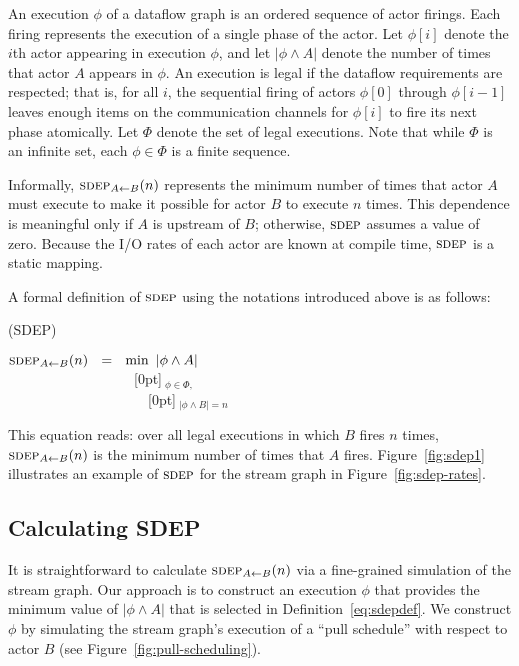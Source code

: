 An execution $\phi$ of a dataflow graph is an ordered sequence of
actor firings.  Each firing represents the execution of a single phase
of the actor.  Let $\phi[i]$ denote the $i$th actor appearing in
execution $\phi$, and let $|\phi \wedge A|$ denote the number of times
that actor $A$ appears in $\phi$.  An execution is legal if the
dataflow requirements are respected; that is, for all $i$, the
sequential firing of actors $\phi[0]$ through $\phi[i-1]$ leaves
enough items on the communication channels for $\phi[i]$ to fire its
next phase atomically.  Let $\Phi$ denote the set of legal executions.
Note that while $\Phi$ is an infinite set, each $\phi \in \Phi$ is a
finite sequence.

Informally, $\textsc{sdep}_{A \small{\leftarrow} B}(n)$ represents the minimum number of times
that actor $A$ must execute to make it possible for actor $B$ to
execute $n$ times.  This dependence is meaningful only if $A$ is
upstream of $B$; otherwise, $\textsc{sdep}$ assumes a value of zero.  Because
the I/O rates of each actor are known at compile time, $\textsc{sdep}$ is a
static mapping.

A formal definition of $\textsc{sdep}$ using the notations introduced above is
as follows:
\begin{definition}(SDEP)
\begin{center}
$\textsc{sdep}_{A \small{\leftarrow} B}(n)~~ = ~~\min~|\phi \wedge A|$ \\
~~~~~~~~~~~~~~~~~{\tiny ~}\raisebox{5pt}[0pt]{$~_{\phi \in \Phi,}$} \\
~~~~~~~~~~~~~~~~~~~{\tiny ~}\hspace{-1.3pt}\raisebox{8pt}[0pt]{$~_{|\phi \wedge B| = n}$}
\label{eq:sdepdef}
\end{center}
\vspace{-12pt}
\end{definition}
This equation reads: over all legal executions in which $B$ fires $n$
times, $\textsc{sdep}_{A \small{\leftarrow} B}(n)$ is the minimum number of times that $A$
fires.  Figure~\ref{fig:sdep1} illustrates an example of $\textsc{sdep}$ for
the stream graph in Figure~\ref{fig:sdep-rates}.

\subsection*{Calculating SDEP}

It is straightforward to calculate $\textsc{sdep}_{A \small{\leftarrow} B}(n)$ via a
fine-grained simulation of the stream graph.  Our approach is to
construct an execution $\phi$ that provides the minimum value of
$|\phi \wedge A|$ that is selected in Definition~\ref{eq:sdepdef}.  We
construct $\phi$ by simulating the stream graph's execution of a
``pull schedule'' with respect to actor $B$ (see Figure~\ref{fig:pull-scheduling}).


